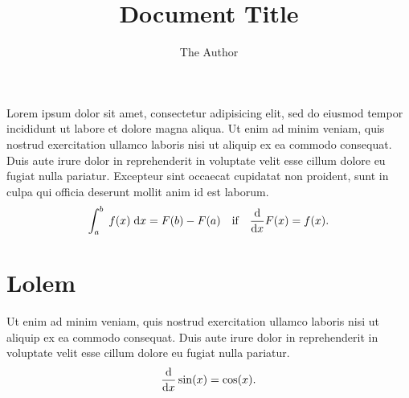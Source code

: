\documentclass{article}
\title{Document Title}
\author{The Author}
\begin{document}
\maketitle
Lorem ipsum dolor sit amet, consectetur adipisicing elit, sed do eiusmod tempor
incididunt ut labore et dolore magna aliqua.
Ut enim ad minim veniam, quis nostrud exercitation
ullamco laboris nisi ut aliquip ex ea commodo consequat.
Duis aute irure dolor in reprehenderit in voluptate velit esse
cillum dolore eu fugiat nulla pariatur.
Excepteur sint occaecat cupidatat non proident, sunt in culpa qui officia
deserunt mollit anim id est laborum.
\begin{equation}
	\int_a^b\;f(x)\;\mathrm{d}x = F(b) - F(a) \quad\text{if}\quad \diff{F(x)}{x} = f(x).
\end{equation}
\section{Lolem}
Ut enim ad minim veniam, quis nostrud exercitation
ullamco laboris nisi ut aliquip ex ea commodo consequat.
Duis aute irure dolor in reprehenderit in voluptate velit esse
cillum dolore eu fugiat nulla pariatur.
\begin{equation}
	\diff{\sin(x)}{x} = \cos(x).
\end{equation}
\end{document}
